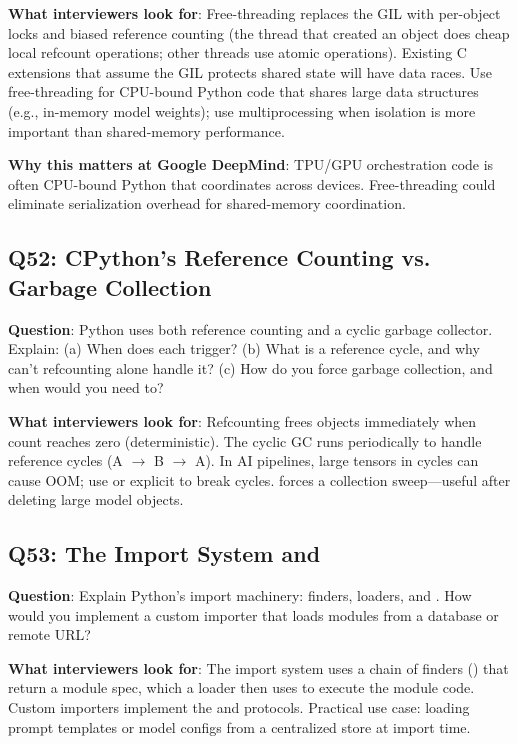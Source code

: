 \textbf{What interviewers look for}: Free-threading replaces the GIL with per-object locks and biased reference counting (the thread that created an object does cheap local refcount operations; other threads use atomic operations). Existing C extensions that assume the GIL protects shared state will have data races. Use free-threading for CPU-bound Python code that shares large data structures (e.g., in-memory model weights); use multiprocessing when isolation is more important than shared-memory performance.

\textbf{Why this matters at Google DeepMind}: TPU/GPU orchestration code is often CPU-bound Python that coordinates across devices. Free-threading could eliminate serialization overhead for shared-memory coordination.

\subsection{Q52: CPython's Reference Counting vs. Garbage Collection}

\textbf{Question}: Python uses both reference counting and a cyclic garbage collector. Explain: (a) When does each trigger? (b) What is a reference cycle, and why can't refcounting alone handle it? (c) How do you force garbage collection, and when would you need to?

\textbf{What interviewers look for}: Refcounting frees objects immediately when count reaches zero (deterministic). The cyclic GC runs periodically to handle reference cycles (A $\to$ B $\to$ A). In AI pipelines, large tensors in cycles can cause OOM; use  or explicit  to break cycles.  forces a collection sweep---useful after deleting large model objects.

\subsection{Q53: The Import System and }

\textbf{Question}: Explain Python's import machinery: finders, loaders, and . How would you implement a custom importer that loads modules from a database or remote URL?

\textbf{What interviewers look for}: The import system uses a chain of finders () that return a module spec, which a loader then uses to execute the module code. Custom importers implement the  and  protocols. Practical use case: loading prompt templates or model configs from a centralized store at import time.


